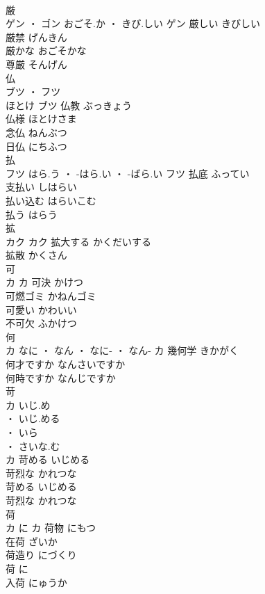 \documentclass[8pt]{extreport}
\begin{document}
\begin{CJK}{UTF8}{min}
\\	厳	
\\	ゲン ・ ゴン	おごそ.か ・ きび.しい	ゲン	厳しい	きびしい	
\\	厳禁	げんきん	
\\	厳かな	おごそかな	
\\	尊厳	そんげん	
\\	仏	
\\	ブツ ・ フツ
\\	ほとけ	ブツ	仏教	ぶっきょう	
\\	仏様	ほとけさま	
\\	念仏	ねんぶつ	
\\	日仏	にちふつ	
\\	払	
\\	フツ	はら.う ・ -はら.い ・ -ばら.い	フツ	払底	ふってい	
\\	支払い	しはらい	
\\	払い込む	はらいこむ	
\\	払う	はらう	
\\	拡	
\\	カク		カク	拡大する	かくだいする	
\\	拡散	かくさん	
\\	可	
\\	カ		カ	可決	かけつ	
\\	可燃ゴミ	かねんゴミ	
\\	可愛い	かわいい	
\\	不可欠	ふかけつ	
\\	何	
\\	カ	なに ・ なん ・ なに- ・ なん-	カ	幾何学	きかがく	
\\	何才ですか	なんさいですか	
\\	何時ですか	なんじですか	
\\	苛	
\\	カ	いじ.め
\\	・ いじ.める
\\	・ いら
\\	・ さいな.む
\\	カ	苛める	いじめる	
\\	苛烈な	かれつな	
\\	苛める	いじめる	
\\	苛烈な	かれつな	
\\	荷	
\\	カ	に	カ	荷物	にもつ	
\\	在荷	ざいか	
\\	荷造り	にづくり	
\\	荷	に	
\\	入荷	にゅうか	

\end{CJK}
\end{document}
